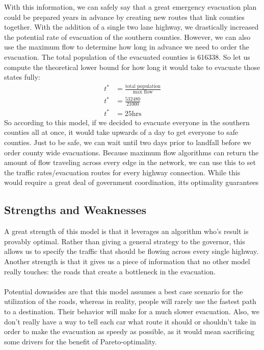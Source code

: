 \documentclass[titlepage]{article}
\begin{document}
    With this information, we can safely say that a great emergency evacuation plan could be prepared years in advance by creating new routes that link counties together. With the addition of a single two lane highway, we drastically increased the potential rate of evacuation of the southern counties. However, we can also use the maximum flow to determine how long in advance we need to order the evacuation.
    The total population of the evacuated counties is 616338. So let us compute the theoretical lower bound for how long it would take to evacuate those states fully:
    \begin{align*}
        t^* &= \frac{\text{total population}}{\text{max flow}}\\
        t^* &= \frac{532480}{21000}\\
        t^* &= 25 \text{hrs}
    \end{align*}
    So according to this model, if we decided to evacuate everyone in the southern counties all at once, it would take upwards of a day to get everyone to safe counties. Just to be safe, we can wait until two days prior to landfall before we order county wide evacuations. Because maximum flow algorithms can return the amount of flow traveling across every edge in the network, we can use this to set the traffic rates/evacuation routes for every highway connection. While this would require a great deal of government coordination, itts optimality guarantees

  \subsection{Strengths and Weaknesses}
    A great strength of this model is that it leverages an algorithm who's result is provably optimal. Rather than giving a general strategy to the governor, this allows us to specify the traffic that should be flowing across every single highway. Another strength is that it gives us a piece of information that no other model really touches: the roads that create a bottleneck in the evacuation.\\
    \\
    Potential downsides are that this model assumes a best case scenario for the utilization of the roads, whereas in reality, people will rarely use the fastest path to a destination. Their behavior will make for a much slower evacuation. Also, we don't really have a way to tell each car what route it should or shouldn't take in order to make the evacuation as speedy as possible, as it would mean sacrificing some drivers for the benefit of Pareto-optimality.
\end{document}
